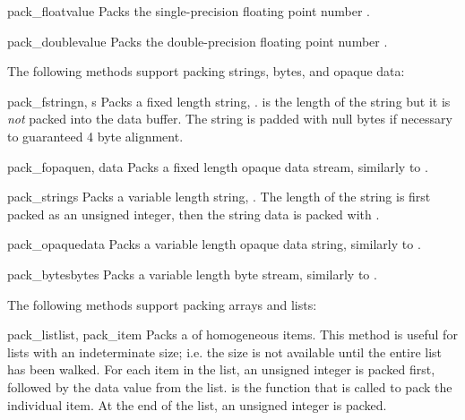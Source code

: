 \begin{funcdesc}{pack_float}{value}
Packs the single-precision floating point number .
\end{funcdesc}

\begin{funcdesc}{pack_double}{value}
Packs the double-precision floating point number .
\end{funcdesc}

The following methods support packing strings, bytes, and opaque data:

\begin{funcdesc}{pack_fstring}{n, s}
Packs a fixed length string, .   is the length of the
string but it is \emph{not} packed into the data buffer.  The string
is padded with null bytes if necessary to guaranteed 4 byte alignment.
\end{funcdesc}

\begin{funcdesc}{pack_fopaque}{n, data}
Packs a fixed length opaque data stream, similarly to
.
\end{funcdesc}

\begin{funcdesc}{pack_string}{s}
Packs a variable length string, .  The length of the string is
first packed as an unsigned integer, then the string data is packed
with .
\end{funcdesc}

\begin{funcdesc}{pack_opaque}{data}
Packs a variable length opaque data string, similarly to
.
\end{funcdesc}

\begin{funcdesc}{pack_bytes}{bytes}
Packs a variable length byte stream, similarly to .
\end{funcdesc}

The following methods support packing arrays and lists:

\begin{funcdesc}{pack_list}{list, pack_item}
Packs a  of homogeneous items.  This method is useful for
lists with an indeterminate size; i.e. the size is not available until
the entire list has been walked.  For each item in the list, an
unsigned integer  is packed first, followed by the data value
from the list.   is the function that is called to pack
the individual item.  At the end of the list, an unsigned integer
 is packed.
\end{funcdesc}


